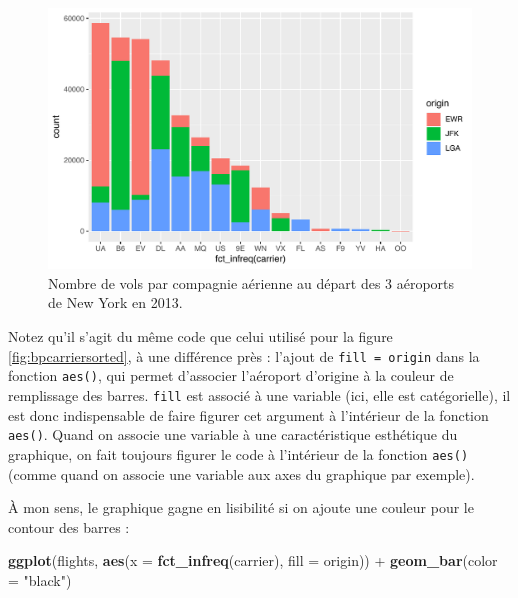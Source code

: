 \documentclass[a4paperpaper,]{article}
\newenvironment{Shaded}{\begin{snugshade}}{\end{snugshade}}
\newcommand{\DataTypeTok}[1]{\textcolor[rgb]{0.00,0.34,0.68}{#1}}
\newcommand{\KeywordTok}[1]{\textcolor[rgb]{0.12,0.11,0.11}{\textbf{#1}}}
\newcommand{\NormalTok}[1]{\textcolor[rgb]{0.12,0.11,0.11}{#1}}
\newcommand{\OperatorTok}[1]{\textcolor[rgb]{0.12,0.11,0.11}{#1}}
\newcommand{\StringTok}[1]{\textcolor[rgb]{0.75,0.01,0.01}{#1}}
\begin{document}
\begin{figure}[htpb]

{\centering \includegraphics[width=0.9\linewidth]{figure/stacked-1} 

}

\caption{Nombre de vols par compagnie aérienne au départ des 3 aéroports de New York en 2013.}\label{fig:stacked}
\end{figure}

Notez qu'il s'agit du même code que celui utilisé pour la figure \ref{fig:bpcarriersorted}, à une différence près : l'ajout de \texttt{fill\ =\ origin} dans la fonction \texttt{aes()}, qui permet d'associer l'aéroport d'origine à la couleur de remplissage des barres. \texttt{fill} est associé à une variable (ici, elle est catégorielle), il est donc indispensable de faire figurer cet argument à l'intérieur de la fonction \texttt{aes()}. Quand on associe une variable à une caractéristique esthétique du graphique, on fait toujours figurer le code à l'intérieur de la fonction \texttt{aes()} (comme quand on associe une variable aux axes du graphique par exemple).

À mon sens, le graphique gagne en lisibilité si on ajoute une couleur pour le contour des barres :

\begin{Shaded}
\begin{Highlighting}[]
\KeywordTok{ggplot}\NormalTok{(flights, }\KeywordTok{aes}\NormalTok{(}\DataTypeTok{x =} \KeywordTok{fct_infreq}\NormalTok{(carrier), }\DataTypeTok{fill =}\NormalTok{ origin)) }\OperatorTok{+}
\StringTok{  }\KeywordTok{geom_bar}\NormalTok{(}\DataTypeTok{color =} \StringTok{"black"}\NormalTok{)}
\end{Highlighting}
\end{Shaded}
\end{document}
